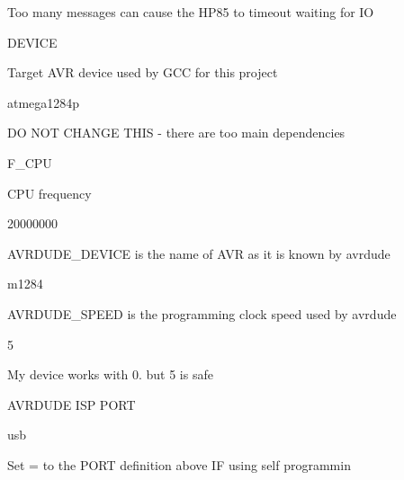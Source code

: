 \begin{DoxyItemize}
\begin{DoxyItemize}
\begin{DoxyItemize}
\begin{DoxyItemize}
\begin{DoxyItemize}
\item Too many messages can cause the H\+P85 to timeout waiting for IO
\end{DoxyItemize}
\end{DoxyItemize}
\end{DoxyItemize}
\item D\+E\+V\+I\+CE
\begin{DoxyItemize}
\item Target A\+VR device used by G\+CC for this project
\item atmega1284p
\begin{DoxyItemize}
\item DO N\+OT C\+H\+A\+N\+GE T\+H\+IS -\/ there are too main dependencies
\end{DoxyItemize}
\end{DoxyItemize}
\item F\+\_\+\+C\+PU
\begin{DoxyItemize}
\item C\+PU frequency
\begin{DoxyItemize}
\item 20000000
\end{DoxyItemize}
\end{DoxyItemize}
\item A\+V\+R\+D\+U\+D\+E\+\_\+\+D\+E\+V\+I\+CE is the name of A\+VR as it is known by avrdude
\begin{DoxyItemize}
\item m1284
\end{DoxyItemize}
\item A\+V\+R\+D\+U\+D\+E\+\_\+\+S\+P\+E\+ED is the programming clock speed used by avrdude
\begin{DoxyItemize}
\item 5
\begin{DoxyItemize}
\item My device works with 0. but 5 is safe
\end{DoxyItemize}
\end{DoxyItemize}
\end{DoxyItemize}
\end{DoxyItemize}

A\+V\+R\+D\+U\+DE I\+SP P\+O\+RT
\begin{DoxyItemize}
\item usb
\begin{DoxyItemize}
\item Set = to the P\+O\+RT definition above IF using self programmin
\end{DoxyItemize}
\end{DoxyItemize}

